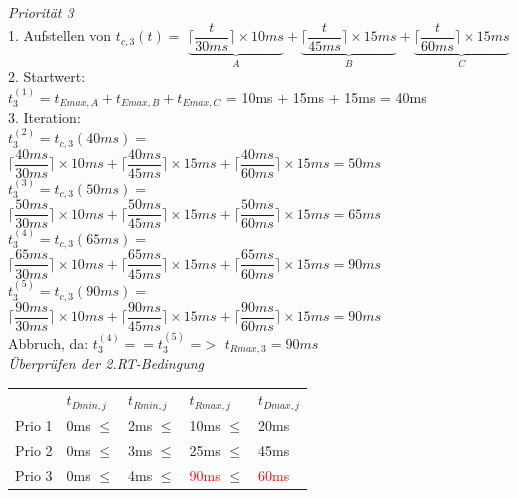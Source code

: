 \documentclass[12pt,a4paper,oneside,ngerman]{article}
\newcommand\tab[1][1cm]{\hspace*{#1}}
\begin{document}
\emph{Priorität 3}\\
1. Aufstellen von \( t_{c,3}(t) =\) \(\underbrace{\Big\lceil \dfrac{t}{ 30ms } \Big\rceil \times 10ms }_{A} + \underbrace{\Big\lceil \dfrac{t}{ 45ms } \Big\rceil \times 15ms}_{B} + \underbrace{\Big\lceil \dfrac{t}{ 60ms } \Big\rceil \times 15ms}_{C}\) \\
2. Startwert:\\ \( t_{3}^{(1)} = t_{Emax,A} + t_{Emax,B} + t_{Emax,C} \) = 10ms + 15ms + 15ms = 40ms \\
3. Iteration:\\ \( t_{3}^{(2)} = t_{c,3}(40ms) =\)\\ \tab \( \Big\lceil \dfrac{40ms}{30ms} \Big\rceil \times 10ms + \Big\lceil \dfrac{40ms}{45ms} \Big\rceil \times 15ms + \Big\lceil \dfrac{40ms}{60ms} \Big\rceil \times 15ms = 50ms\)\\
				\( t_{3}^{(3)} = t_{c,3}(50ms) =\)\\ \tab \( \Big\lceil \dfrac{50ms}{30ms} \Big\rceil \times 10ms + \Big\lceil \dfrac{50ms}{45ms} \Big\rceil \times 15ms + \Big\lceil \dfrac{50ms}{60ms} \Big\rceil \times 15ms = 65ms\)\\
				\( t_{3}^{(4)} = t_{c,3}(65ms) =\)\\ \tab \( \Big\lceil \dfrac{65ms}{30ms} \Big\rceil \times 10ms + \Big\lceil \dfrac{65ms}{45ms} \Big\rceil \times 15ms + \Big\lceil \dfrac{65ms}{60ms} \Big\rceil \times 15ms = 90ms\)\\
				\( t_{3}^{(5)} = t_{c,3}(90ms) =\)\\ \tab \( \Big\lceil \dfrac{90ms}{30ms} \Big\rceil \times 10ms + \Big\lceil \dfrac{90ms}{45ms} \Big\rceil \times 15ms + \Big\lceil \dfrac{90ms}{60ms} \Big\rceil \times 15ms = 90ms\)\\
Abbruch, da: \( t_{3}^{(4)} == t_{3}^{(5)} \) =$>$ \( t_{Rmax,3} = 90ms \)\\

\emph{Überprüfen der 2.RT-Bedingung}\\

\begin{table}[H]
	\begin{tabular}{lllll}
		   & \( t_{Dmin,j}\) & \(t_{Rmin,j}\) & \(t_{Rmax,j}\) & \(t_{Dmax,j}\) \\
	Prio 1 & 0ms $\leq$		 & 2ms $\leq$     & 10ms $\leq$    & 20ms          \\
	Prio 2 & 0ms $\leq$      & 3ms $\leq$     & 25ms $\leq$    & 45ms          \\
	Prio 3 & 0ms $\leq$      & 4ms $\leq$     & \textcolor{red}{90ms} $\leq$    & \textcolor{red}{60ms} \\
	\end{tabular}
\end{table}
\end{document}

